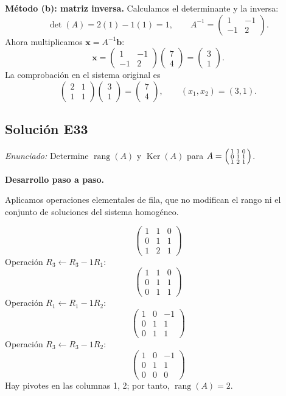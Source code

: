 \documentclass[12pt]{article}
\theoremstyle{remark}
\newcommand{\rang}{\operatorname{rang}}
\newcommand{\Ker}{\operatorname{Ker}}
\newcommand{\vect}[1]{\boldsymbol{#1}}
\newcommand{\solucion}[2]{\Needspace{11\baselineskip}\subsection*{Solución E#1}\noindent\textit{Enunciado:} #2\par\medskip\noindent\textbf{Desarrollo paso a paso.}\par\medskip}
\begin{document}
\textbf{Método (b): matriz inversa.} Calculamos el determinante y la inversa:
\[
\det(A)=2(1)-1(1)=1,\qquad A^{-1}=\begin{pmatrix}1&-1\\-1&2\end{pmatrix}.
\]
Ahora multiplicamos $\vect x=A^{-1}\vect b$:
\[
\vect x=\begin{pmatrix}1&-1\\-1&2\end{pmatrix}\begin{pmatrix}7\\4\end{pmatrix}=\begin{pmatrix}3\\1\end{pmatrix}.
\]
La comprobación en el sistema original es
\[
\begin{pmatrix}2&1\\1&1\end{pmatrix}\begin{pmatrix}3\\1\end{pmatrix}=\begin{pmatrix}7\\4\end{pmatrix},\qquad\boxed{(x_1,x_2)=(3,1)}.
\]

\medskip

\solucion{33}{Determine $\rang(A)$ y $\Ker(A)$ para $A=\begin{psmallmatrix}1&1&0\\0&1&1\\1&2&1\end{psmallmatrix}$.}
Aplicamos operaciones elementales de fila, que no modifican el rango ni el conjunto de soluciones del sistema homogéneo.

\[
\begin{pmatrix}1&1&0\\0&1&1\\1&2&1\end{pmatrix}
\]
Operación $R_{3}\leftarrow R_{3}-1R_{1}$:
\[
\begin{pmatrix}1&1&0\\0&1&1\\0&1&1\end{pmatrix}
\]
Operación $R_{1}\leftarrow R_{1}-1R_{2}$:
\[
\begin{pmatrix}1&0&-1\\0&1&1\\0&1&1\end{pmatrix}
\]
Operación $R_{3}\leftarrow R_{3}-1R_{2}$:
\[
\begin{pmatrix}1&0&-1\\0&1&1\\0&0&0\end{pmatrix}
\]
Hay pivotes en las columnas 1, 2; por tanto, $\boxed{\rang(A)=2}$.
\end{document}
